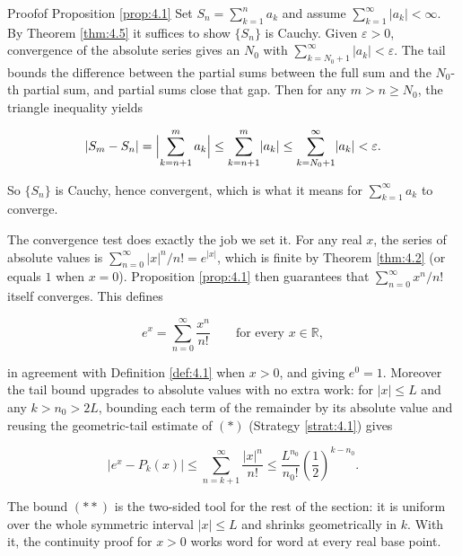 \documentclass[a4paper,12pt,oneside]{memoir}
\begin{document}
\begin{envproof}{Proof}{}{of Proposition \ref{prop:4.1}}
Set \(S_{n} = \sum_{k=1}^{n} a_{k}\) and assume \(\sum_{k=1}^{\infty} \lvert a_{k} \rvert < \infty\). By Theorem \ref{thm:4.5} it suffices to show \(\{S_{n}\}\) is Cauchy. Given \(\varepsilon > 0\), convergence of the absolute series gives an \(N_{0}\) with \(\sum_{k = N_{0} + 1}^{\infty} \lvert a_{k} \rvert < \varepsilon\). The tail bounds the difference between the partial sums between the full sum and the \(N_{0}\)-th partial sum, and partial sums close that gap. Then for any \(m > n \ge N_{0}\), the triangle inequality yields

\[ \lvert S_{m} - S_{n} \rvert = \Bigl\lvert \sum_{k = n + 1}^{m} a_{k} \Bigr\rvert \le \sum_{k = n + 1}^{m} \lvert a_{k} \rvert \le \sum_{k = N_{0} + 1}^{\infty} \lvert a_{k} \rvert < \varepsilon. \]

So \(\{S_{n}\}\) is Cauchy, hence convergent, which is what it means for \(\sum_{k=1}^{\infty} a_{k}\) to converge. \qedmark
\end{envproof}
The convergence test does exactly the job we set it. For any real \(x\), the series of absolute values is \(\sum_{n=0}^{\infty} \lvert x \rvert^{n}/n! = e^{\lvert x \rvert}\), which is finite by Theorem \ref{thm:4.2} (or equals \(1\) when \(x = 0\)). Proposition \ref{prop:4.1} then guarantees that \(\sum_{n=0}^{\infty} x^{n}/n!\) itself converges. This defines

\[ e^{x} = \sum_{n=0}^{\infty} \frac{x^{n}}{n!} \qquad \text{for every } x \in \mathbb{R}, \]

in agreement with Definition \ref{def:4.1} when \(x > 0\), and giving \(e^{0} = 1\). Moreover the tail bound upgrades to absolute values with no extra work: for \(\lvert x \rvert \le L\) and any \(k > n_{0} > 2L\), bounding each term of the remainder by its absolute value and reusing the geometric-tail estimate of \((*)\) (Strategy \ref{strat:4.1}) gives

\[ \lvert e^{x} - P_{k}(x) \rvert \le \sum_{n = k + 1}^{\infty} \frac{\lvert x \rvert^{n}}{n!} \le \frac{L^{n_{0}}}{n_{0}!} \left(\frac{1}{2}\right)^{k - n_{0}}. \tag{$**$} \]

The bound \((**)\) is the two-sided tool for the rest of the section: it is uniform over the whole symmetric interval \(\lvert x \rvert \le L\) and shrinks geometrically in \(k\). With it, the continuity proof for \(x > 0\) works word for word at every real base point.
\end{document}
